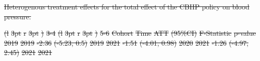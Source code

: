 \documentclass[
  letterpaper,
  DIV=11,
  numbers=noendperiod]{scrartcl}
\makeatletter
\renewenvironment{table}%
   {\renewcommand\familydefault\sfdefault
    \@float{table}}
   {\end@float}
\providecommand{\DIFdeltex}[1]{{\protect\color{red}\sout{#1}}}                      %
\providecommand{\DIFdelFL}[1]{\DIFdel{#1}} %
\providecommand{\DIFdel}[1]{\texorpdfstring{\DIFdeltex{#1}}{}} %
\makeatother
\begin{document}
{%
\DIFdelFL{Heterogenous treatment effects for the total effect of the CBHP policy
on blood pressure. }}%

\DIFdelFL{(l}%
\DIFdelFL{3pt}%
\DIFdelFL{r}%
\DIFdelFL{3pt}%
\DIFdelFL{)}%
\DIFdelFL{3-4}%
\DIFdelFL{(l}%
\DIFdelFL{3pt}%
\DIFdelFL{r}%
\DIFdelFL{3pt}%
\DIFdelFL{)}%
\DIFdelFL{5-6}%
\DIFdelFL{Cohort }%
\DIFdelFL{Time }%
\DIFdelFL{ATT }%
\DIFdelFL{(95\%CI) }%
\DIFdelFL{F-Statistic }%
\DIFdelFL{p-value}%
\DIFdelFL{\hspace{1em}2019 }%
\DIFdelFL{2019 }%
\DIFdelFL{-2.36 }%
\DIFdelFL{(-5.23, 0.5) }%
\DIFdelFL{\hspace{1em}2019 }%
\DIFdelFL{2021 }%
\DIFdelFL{-1.51 }%
\DIFdelFL{(-4.01, 0.98) }%
\DIFdelFL{\hspace{1em}2020 }%
\DIFdelFL{2021 }%
\DIFdelFL{-1.26 }%
\DIFdelFL{(-4.97, 2.45) }%
\DIFdelFL{\hspace{1em}2021 }%
\DIFdelFL{2021 }%
\end{document}
